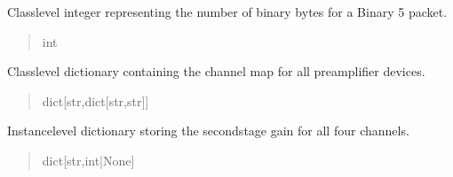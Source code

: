 \documentclass[letterpaper,10pt,english]{sphinxmanual}
\begin{document}
\begin{fulllineitems}
\begin{fulllineitems}
\end{fulllineitems}


\begin{fulllineitems}
\label{\detokenize{PodDevice_8401HR:PodDevice_8401HR.POD_8401HR.__B5BINARYLENGTH}}
\pysigstartsignatures
{}
\pysigstopsignatures
\sphinxAtStartPar
Class\sphinxhyphen{}level integer representing the number of binary bytes for a             Binary 5 packet.
\begin{quote}\begin{description}
\sphinxAtStartPar
int

\end{description}\end{quote}

\end{fulllineitems}


\begin{fulllineitems}
\label{\detokenize{PodDevice_8401HR:PodDevice_8401HR.POD_8401HR.__CHANNELMAPALL}}
\pysigstartsignatures
{}
\pysigstopsignatures
\sphinxAtStartPar
Class\sphinxhyphen{}level dictionary containing the channel map for             all preamplifier devices.
\begin{quote}\begin{description}
\sphinxAtStartPar
dict{[}str,dict{[}str,str{]}{]}

\end{description}\end{quote}

\end{fulllineitems}


\begin{fulllineitems}
\label{\detokenize{PodDevice_8401HR:PodDevice_8401HR.POD_8401HR._ssGain}}
\pysigstartsignatures
{}
\pysigstopsignatures
\sphinxAtStartPar
Instance\sphinxhyphen{}level dictionary storing the second\sphinxhyphen{}stage gain for all             four channels.
\begin{quote}\begin{description}
\sphinxAtStartPar
dict{[}str,int|None{]}


\end{description}
\end{quote}
\end{fulllineitems}
\end{fulllineitems}
\end{document}
